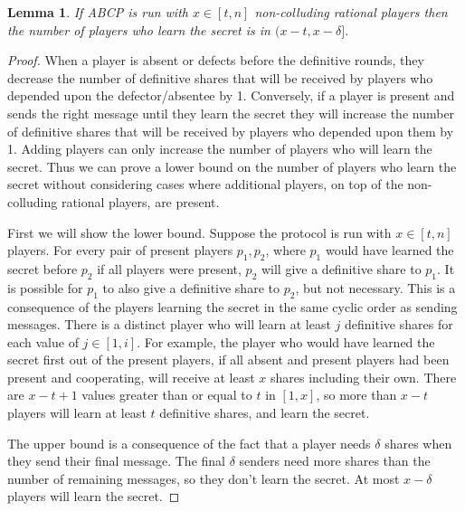 \documentclass{dalcsthesis}
\newtheorem{lemma}{Lemma}
\begin{document}
\begin{lemma}\label{Lem:ABCP:SomeDeltaLose}If ABCP is run with $x \in [t,n]$ non-colluding rational players then the number of players who learn the secret is in $(x-t, x-\delta]$.\end{lemma}
\begin{proof}
When a player is absent or defects before the definitive rounds, they decrease the number of definitive shares that will be received by players who depended upon the defector/absentee by 1. Conversely, if a player is present and sends the right message until they learn the secret they will increase the number of definitive shares that will be received by players who depended upon them by 1. Adding players can only increase the number of players who will learn the secret. Thus we can prove a lower bound on the number of players who learn the secret without considering cases where additional players, on top of the non-colluding rational players, are present.

First we will show the lower bound. Suppose the protocol is run with $x \in [t,n]$ players. For every pair of present players $p_1, p_2$, where $p_1$ would have learned the secret before $p_2$ if all players were present, $p_2$ will give a definitive share to $p_1$. It is possible for $p_1$ to also give a definitive share to $p_2$, but not necessary. This is a consequence of the players learning the secret in the same cyclic order as sending messages. There is a distinct player who will learn at least $j$ definitive shares for each value of $j \in [1, i]$. For example, the player who would have learned the secret first out of the present players, if all absent and present players had been present and cooperating, will receive at least $x$ shares including their own. There are $x-t+1$ values greater than or equal to $t$ in $[1,x]$, so more than $x-t$ players will learn at least $t$ definitive shares, and learn the secret.

The upper bound is a consequence of the fact that a player needs $\delta$ shares when they send their final message. The final $\delta$ senders need more shares than the number of remaining messages, so they don't learn the secret. At most $x-\delta$ players will learn the secret.  
\end{proof}
\end{document}
